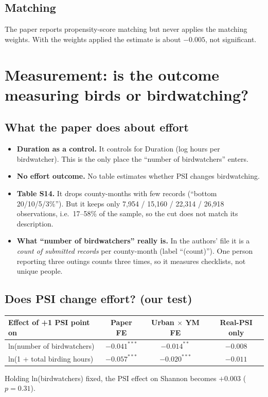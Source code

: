 \documentclass[11pt]{article}
\begin{document}
\subsection{Matching}
The paper reports propensity-score matching but never applies the matching weights. With the weights applied the estimate is about $-0.005$, not significant.

\section{Measurement: is the outcome measuring birds or birdwatching?}
\subsection{What the paper does about effort}
\begin{itemize}[leftmargin=14pt,itemsep=2pt]
\item \textbf{Duration as a control.} It controls for Duration (log hours per birdwatcher). This is the only place the ``number of birdwatchers'' enters.
\item \textbf{No effort outcome.} No table estimates whether PSI changes birdwatching.
\item \textbf{Table S14.} It drops county-months with few records (``bottom 20/10/5/3\%''). But it keeps only 7,954 / 15,160 / 22,314 / 26,918 observations, i.e.\ 17--58\% of the sample, so the cut does not match its description.
\item \textbf{What ``number of birdwatchers'' really is.} In the authors' file it is a \emph{count of submitted records} per county-month (label ``(count)''). One person reporting three outings counts three times, so it measures checklists, not unique people.
\end{itemize}

\subsection{Does PSI change effort? (our test)}
\begin{center}\small
\begin{tabular}{lccc}
\toprule
Effect of +1 PSI point on & Paper FE & Urban $\times$ YM FE & Real-PSI only \\
\midrule
ln(number of birdwatchers) & $-0.041^{***}$ & $-0.014^{**}$ & $-0.008$ \\
ln(1 + total birding hours) & $-0.057^{***}$ & $-0.020^{***}$ & $-0.011$ \\
\bottomrule
\end{tabular}
\end{center}
Holding ln(birdwatchers) fixed, the PSI effect on Shannon becomes $+0.003$ ($p=0.31$).
\end{document}
